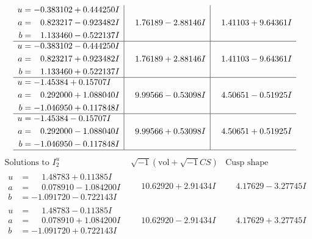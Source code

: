 \documentclass[1p]{elsarticle_modified}
\theoremstyle{definition}
\newcommand{\I}{\sqrt{-1}}
\begin{document}
$$\begin{array}{c|c|c}
\begin{aligned}
u &= -0.383102 + 0.444250 I \\
a &= \phantom{-}0.823217 - 0.923482 I \\
b &= \phantom{-}1.133460 - 0.522137 I\end{aligned}
 & \phantom{-}1.76189 - 2.88146 I & \phantom{-}1.41103 + 9.64361 I \\ \hline\begin{aligned}
u &= -0.383102 - 0.444250 I \\
a &= \phantom{-}0.823217 + 0.923482 I \\
b &= \phantom{-}1.133460 + 0.522137 I\end{aligned}
 & \phantom{-}1.76189 + 2.88146 I & \phantom{-}1.41103 - 9.64361 I \\ \hline\begin{aligned}
u &= -1.45384 + 0.15707 I \\
a &= \phantom{-}0.292000 + 1.088040 I \\
b &= -1.046950 + 0.117848 I\end{aligned}
 & \phantom{-}9.99566 - 0.53098 I & \phantom{-}4.50651 - 0.51925 I \\ \hline\begin{aligned}
u &= -1.45384 - 0.15707 I \\
a &= \phantom{-}0.292000 - 1.088040 I \\
b &= -1.046950 - 0.117848 I\end{aligned}
 & \phantom{-}9.99566 + 0.53098 I & \phantom{-}4.50651 + 0.51925 I\\
 \hline 
 \end{array}$$\newpage$$\begin{array}{c|c|c}  
\text{Solutions to }I^u_{2}& \I (\text{vol} + \sqrt{-1}CS) & \text{Cusp shape}\\
 \hline 
\begin{aligned}
u &= \phantom{-}1.48783 + 0.11385 I \\
a &= \phantom{-}0.078910 - 1.084200 I \\
b &= -1.091720 - 0.722143 I\end{aligned}
 & \phantom{-}10.62920 + 2.91434 I & \phantom{-}4.17629 - 3.27745 I \\ \hline\begin{aligned}
u &= \phantom{-}1.48783 - 0.11385 I \\
a &= \phantom{-}0.078910 + 1.084200 I \\
b &= -1.091720 + 0.722143 I\end{aligned}
 & \phantom{-}10.62920 - 2.91434 I & \phantom{-}4.17629 + 3.27745 I \\ \hline\begin{aligned}

\end{aligned}
\end{array}$$
\end{document}
